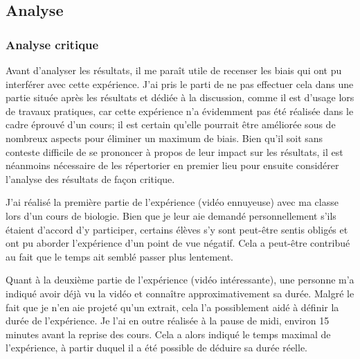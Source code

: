 \documentclass[12pt,fleqn,oneside,french,openany]{book} %
\begin{document}
\subsection{Analyse} \label{ssec:analyse1.1}

\subsubsection{Analyse critique} \label{sssec:analyseCrit1.1}
Avant d'analyser les résultats, il me paraît utile de recenser les biais qui ont pu interférer avec cette expérience. J'ai pris le parti de ne pas effectuer cela dans une partie située après les résultats et dédiée à la discussion, comme il est d'usage lors de travaux pratiques, car cette expérience n'a évidemment pas été réalisée dans le cadre éprouvé d'un cours; il est certain qu'elle pourrait être améliorée sous de nombreux aspects pour éliminer un maximum de biais. Bien qu'il soit sans conteste difficile de se prononcer à propos de leur impact sur les résultats, il est néanmoins nécessaire de les répertorier en premier lieu pour ensuite considérer l'analyse des résultats de façon critique.

J'ai réalisé la première partie de l'expérience (vidéo ennuyeuse) avec ma classe lors d'un cours de biologie. Bien que je leur aie demandé personnellement s'ils étaient d'accord d'y participer, certains élèves s'y sont peut-être sentis obligés et ont pu aborder l'expérience d'un point de vue négatif. Cela a peut-être contribué au fait que le temps ait semblé passer plus lentement.

Quant à la deuxième partie de l'expérience (vidéo intéressante), une personne m'a indiqué avoir déjà vu la vidéo et connaître approximativement sa durée. Malgré le fait que je n'en aie projeté qu'un extrait, cela l'a possiblement aidé à définir la durée de l'expérience.
Je l'ai en outre réalisée à la pause de midi, environ 15 minutes avant la reprise des cours. Cela a alors indiqué le temps maximal de l'expérience, à partir duquel il a été possible de déduire sa durée réelle. 
\end{document}
